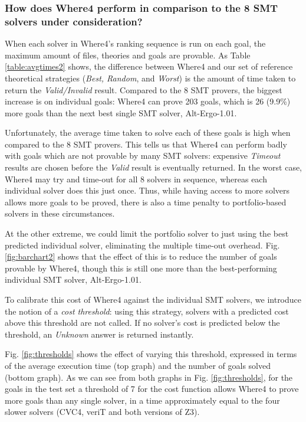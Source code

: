 \documentclass[runningheads,a4paper]{llncs}
\begin{document}
\subsubsection*{How does \textsf{Where4} perform in comparison to the 8 SMT solvers under consideration?}
When each solver in \textsf{Where4}'s ranking sequence is run on each goal, the maximum amount of files, theories and goals are provable. As Table \ref{table:avgtimes2} shows, the difference between \textsf{Where4} and our set of reference theoretical strategies (\textit{Best, Random}, and \textit{Worst}) is the amount of time taken to return the \textit{Valid/Invalid} result. Compared to the 8 SMT provers, the biggest increase is on individual goals: \textsf{Where4} can prove 203 goals, which is 26 (9.9\%) more goals than the next best single SMT solver, Alt-Ergo-1.01.

Unfortunately, the average time taken to solve each of these goals is high when compared to the 8 SMT provers. This tells us that \textsf{Where4} can perform badly with goals which are not provable by many SMT solvers: expensive \textit{Timeout} results are chosen before the \textit{Valid} result is eventually returned.   In the worst case, \textsf{Where4} may try and time-out for all 8 solvers in sequence, whereas each individual solver does this just once.   Thus, while having access to more solvers allows more goals to be proved, there is also a time penalty to portfolio-based solvers in these circumstances.

At the other extreme, we could limit the portfolio solver to just using the best predicted individual solver, eliminating the multiple time-out overhead.
Fig. \ref{fig:barchart2} shows that the effect of this is to reduce the number of goals provable by \textsf{Where4}, though this is still one more than the best-performing individual SMT solver, Alt-Ergo-1.01.

To calibrate this cost of \textsf{Where4} against the individual SMT solvers, we introduce the notion of a \textit{cost threshold}: using this strategy, solvers with a predicted cost above this threshold are not called. If no solver's cost is predicted below the threshold, an \textit{Unknown} answer is returned instantly.  

Fig. \ref{fig:thresholds} shows the effect of varying this threshold, expressed in terms of the average execution time (top graph) and the number of goals solved (bottom graph).  As we can see from both graphs in Fig. \ref{fig:thresholds}, for the goals in the test set a threshold of 7 for the cost function allows \textsf{Where4} to prove more goals than any single solver, in a time approximately equal to the four slower solvers (CVC4, veriT and both versions of Z3). 
\end{document}
